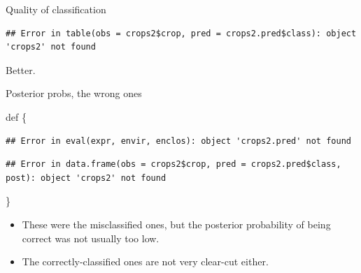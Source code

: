 \documentclass[ignorenonframetext,]{beamer}
\newenvironment{Shaded}{\begin{snugshade}}{\end{snugshade}}
\newcommand{\DataTypeTok}[1]{\textcolor[rgb]{0.13,0.29,0.53}{#1}}
\newcommand{\DecValTok}[1]{\textcolor[rgb]{0.00,0.00,0.81}{#1}}
\newcommand{\KeywordTok}[1]{\textcolor[rgb]{0.13,0.29,0.53}{\textbf{#1}}}
\newcommand{\NormalTok}[1]{#1}
\newcommand{\OperatorTok}[1]{\textcolor[rgb]{0.81,0.36,0.00}{\textbf{#1}}}
\newcommand{\StringTok}[1]{\textcolor[rgb]{0.31,0.60,0.02}{#1}}
\begin{document}
\begin{frame}[fragile]{Quality of classification}
\protect\hypertarget{quality-of-classification}{}

\begin{Shaded}
\end{Shaded}

\begin{verbatim}
## Error in table(obs = crops2$crop, pred = crops2.pred$class): object 'crops2' not found
\end{verbatim}

Better.

\end{frame}

\begin{frame}[fragile]{Posterior probs, the wrong ones}
\protect\hypertarget{posterior-probs-the-wrong-ones}{}

def \{\footnotesize  

\begin{Shaded}
\end{Shaded}

\begin{verbatim}
## Error in eval(expr, envir, enclos): object 'crops2.pred' not found
\end{verbatim}

\begin{Shaded}
\end{Shaded}

\begin{verbatim}
## Error in data.frame(obs = crops2$crop, pred = crops2.pred$class, post): object 'crops2' not found
\end{verbatim}

\}

\begin{itemize}
\item
  These were the misclassified ones, but the posterior probability of
  being correct was not usually too low.
\item
  The correctly-classified ones are not very clear-cut either.
\end{itemize}

\end{frame}
\end{document}
